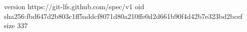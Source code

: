 version https://git-lfs.github.com/spec/v1
oid sha256:fbd647d2b803c1ff5addcf8071d80a210ffe0d2d661b90f4d42b7e323bd2bcef
size 337

